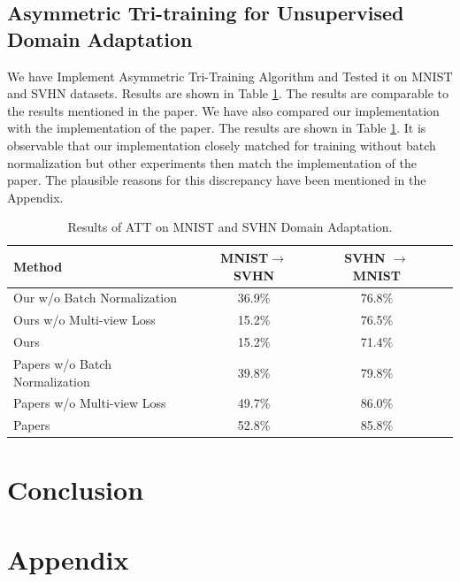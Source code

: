 \documentclass{article}
\begin{document}
\subsection{Asymmetric Tri-training for Unsupervised Domain Adaptation}
We have Implement Asymmetric Tri-Training Algorithm and Tested it on MNIST and SVHN datasets. Results are shown in Table \ref{tab:att_results}. The results are comparable to the results mentioned in the paper. We have also compared our implementation with the implementation of the paper. The results are shown in Table \ref{tab:att_results}. It is observable that our implementation closely matched for training without batch normalization but other experiments then match the implementation of the paper. The plausible reasons for this discrepancy have been mentioned in the Appendix.
\begin{table}
  \centering
  \caption{Results of ATT on MNIST and SVHN Domain Adaptation.}
  \label{tab:att_results}
  \begin{tabular}{lccc}
      \toprule
      \textbf{Method} & \textbf{MNIST\(\to\)SVHN} & \textbf{SVHN \(\to\) MNIST} \\
      \midrule
      Our w/o Batch Normalization & 36.9\% & 76.8\% \\
      Ours w/o Multi-view Loss & 15.2\% & 76.5\% \\
      Ours  & 15.2\% & 71.4\% \\
      \midrule
      Papers w/o Batch Normalization & 39.8\% & 79.8\% \\
      Papers w/o Multi-view Loss & 49.7\% & 86.0\% \\
      Papers  & 52.8\% & 85.8\% \\
      \bottomrule
  \end{tabular}
\end{table}











\section{Conclusion}

\section*{Appendix}



\end{document}
